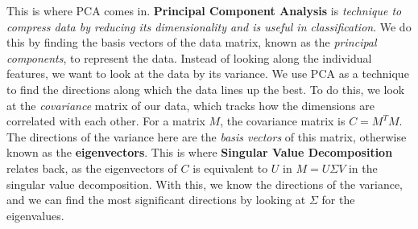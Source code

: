 \documentclass{article}
\begin{document}
This is where PCA comes in. \textbf{Principal Component Analysis} is \textit{technique to compress data by reducing its dimensionality and is useful in classification}. We do this by finding the basis vectors of the data matrix, known as the \textit{principal components}, to represent the data. Instead of looking along the individual features, we want to look at the data by its variance. We use PCA as a technique to find the directions along which the data lines up the best. To do this, we look at the \textit{covariance} matrix of our data, which tracks how the dimensions are correlated with each other. For a matrix $M$, the covariance matrix is $C = M^TM$. The directions of the variance here are the \textit{basis vectors} of this matrix, otherwise known as the \textbf{eigenvectors}. This is where \textbf{Singular Value Decomposition} relates back, as the eigenvectors of $C$ is equivalent to $U$ in $M = U\Sigma V$ in the singular value decomposition. With this, we know the directions of the variance, and we can find the most significant directions by looking at $\Sigma$ for the eigenvalues. 

\newline
\newline
\end{document}
